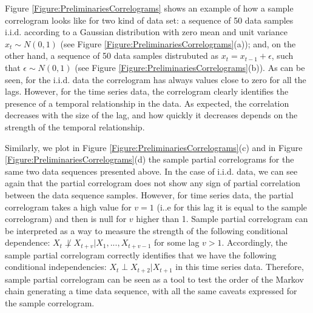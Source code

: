 Figure \ref{Figure:PreliminariesCorrelograms} shows an example of how a sample correlogram looks like for two kind of data set: a sequence of 50 data samples i.i.d. according to a Gaussian distribution with zero mean and unit variance $x_t\sim N(0,1)$ (see Figure \ref{Figure:PreliminariesCorrelograms}(a));  and, on the other hand, a sequence of 50 data samples distrubuted as $x_t=x_{t-1} + \epsilon$, such that $\epsilon\sim N(0,1)$ (see  Figure \ref{Figure:PreliminariesCorrelograms}(b)). As can be seen, for the i.i.d. data the correlogram has always values close to zero for all the lags. However, for the time series data, the correlogram clearly identifies the presence of a temporal relationship in the data. As expected, the correlation decreases with the size of the lag, and how quickly it decreases depends on the strength of the temporal relationship. 

Similarly, we plot in Figure \ref{Figure:PreliminariesCorrelograms}(c) and  in  Figure \ref{Figure:PreliminariesCorrelograms}(d) the sample partial correlograms for the same two data sequences presented above. In the case of i.i.d. data, we can see again that the partial correlogram does not show any sign of partial correlation between the data sequence samples. However, for time series data, the partial correlogram takes a high value for $v=1$ (i..e for this lag it is equal to the sample correlogram) and then is null for $v$ higher than 1. Sample partial correlogram can be interpreted as a way to measure the strength of the following conditional dependence: $X_t  \not\perp X_{t+v} | X_1,...,X_{t+v-1}$ for some lag $v>1$.  Accordingly, the sample partial correlogram correctly identifies that we have the following conditional independencies: $X_t\perp X_{t+2}|X_{t+1}$ in this time series data. Therefore, sample partial correlogram can be seen as a tool to test the order of the Markov chain generating a time data sequence, with all the same caveats expressed for the sample correlogram. 

